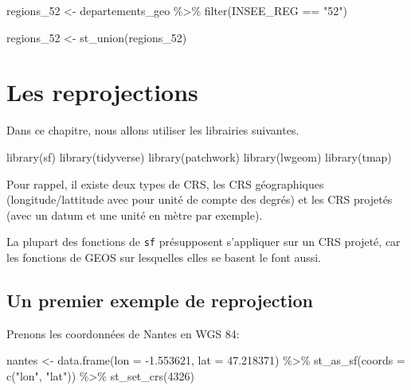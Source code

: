 \documentclass[
]{book}
\newenvironment{Shaded}{\begin{snugshade}}{\end{snugshade}}
\newcommand{\AttributeTok}[1]{\textcolor[rgb]{0.77,0.63,0.00}{#1}}
\newcommand{\DecValTok}[1]{\textcolor[rgb]{0.00,0.00,0.81}{#1}}
\newcommand{\FloatTok}[1]{\textcolor[rgb]{0.00,0.00,0.81}{#1}}
\newcommand{\FunctionTok}[1]{\textcolor[rgb]{0.00,0.00,0.00}{#1}}
\newcommand{\NormalTok}[1]{#1}
\newcommand{\OtherTok}[1]{\textcolor[rgb]{0.56,0.35,0.01}{#1}}
\newcommand{\SpecialCharTok}[1]{\textcolor[rgb]{0.00,0.00,0.00}{#1}}
\newcommand{\StringTok}[1]{\textcolor[rgb]{0.31,0.60,0.02}{#1}}
\begin{document}
\begin{Shaded}
\begin{Highlighting}[]
\NormalTok{regions\_52 }\OtherTok{\textless{}{-}}\NormalTok{ departements\_geo }\SpecialCharTok{\%\textgreater{}\%}
  \FunctionTok{filter}\NormalTok{(INSEE\_REG }\SpecialCharTok{==} \StringTok{"52"}\NormalTok{)}

\NormalTok{regions\_52 }\OtherTok{\textless{}{-}} \FunctionTok{st\_union}\NormalTok{(regions\_52)}
\end{Highlighting}
\end{Shaded}

\hypertarget{les-reprojections}{%
\chapter{Les reprojections}\label{les-reprojections}}

Dans ce chapitre, nous allons utiliser les librairies suivantes.

\begin{Shaded}
\begin{Highlighting}[]
\FunctionTok{library}\NormalTok{(sf)}
\FunctionTok{library}\NormalTok{(tidyverse)}
\FunctionTok{library}\NormalTok{(patchwork)}
\FunctionTok{library}\NormalTok{(lwgeom)}
\FunctionTok{library}\NormalTok{(tmap)}
\end{Highlighting}
\end{Shaded}

Pour rappel, il existe deux types de CRS, les CRS géographiques (longitude/lattitude avec pour unité de compte des degrés) et les CRS projetés (avec un datum et une unité en mètre par exemple).

La plupart des fonctions de \texttt{sf} présupposent s'appliquer sur un CRS projeté, car les fonctions de GEOS sur lesquelles elles se basent le font aussi.

\hypertarget{un-premier-exemple-de-reprojection}{%
\section{Un premier exemple de reprojection}\label{un-premier-exemple-de-reprojection}}

Prenons les coordonnées de Nantes en WGS 84:

\begin{Shaded}
\begin{Highlighting}[]
\NormalTok{nantes }\OtherTok{\textless{}{-}} \FunctionTok{data.frame}\NormalTok{(}\AttributeTok{lon =} \SpecialCharTok{{-}}\FloatTok{1.553621}\NormalTok{, }\AttributeTok{lat =} \FloatTok{47.218371}\NormalTok{) }\SpecialCharTok{\%\textgreater{}\%}
  \FunctionTok{st\_as\_sf}\NormalTok{(}\AttributeTok{coords =} \FunctionTok{c}\NormalTok{(}\StringTok{"lon"}\NormalTok{, }\StringTok{"lat"}\NormalTok{)) }\SpecialCharTok{\%\textgreater{}\%}
  \FunctionTok{st\_set\_crs}\NormalTok{(}\DecValTok{4326}\NormalTok{)}
\end{Highlighting}
\end{Shaded}
\end{document}
